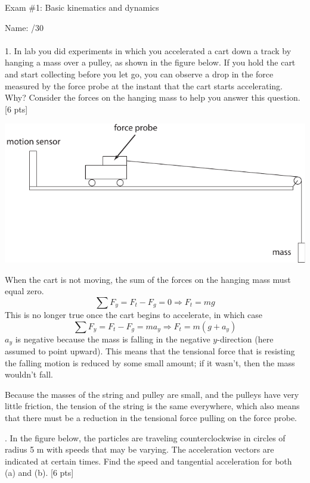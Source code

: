 \documentclass[11pt,letterpaper]{article}
\newcommand{\sol}[1]{{\color{NavyBlue} #1}}
\begin{document}
\setlength{\parindent}{0cm}
\setlength{\parskip}{11pt}
Exam \#1: Basic kinematics and dynamics

Name: \hfill /30\\

\hrulefill\\
1. In lab you did experiments in which you accelerated a cart down a track by hanging a mass over a pulley, as shown in the figure below. If you hold the cart and start collecting before you let go, you can observe a drop in the force measured by the force probe at the instant that the cart starts accelerating. Why? Consider the forces on the hanging mass to help you answer this question. [6 pts]

\includegraphics[width=\textwidth]{../../labs/lab3-forces/cart_and_pulley.pdf}

\sol{When the cart is not moving, the sum of the forces on the hanging mass must equal zero.
\begin{equation}
\sum F_y = F_t - F_g = 0 \Rightarrow F_t = mg
\end{equation}
This is no longer true once the cart begins to accelerate, in which case
\begin{equation}
\sum F_y = F_t - F_g = ma_y \Rightarrow F_t = m(g+a_y)
\end{equation}
$a_y$ is negative because the mass is falling in the negative $y$-direction (here assumed to point upward). This means that the tensional force that is resisting the falling motion is reduced by some small amount; if it wasn't, then the mass wouldn't fall.

Because the masses of the string and pulley are small, and the pulleys have very little friction, the tension of the string is the same everywhere, which also means that there must be a reduction in the tensional force pulling on the force probe.

}

. In the figure below, the particles are traveling counterclockwise in circles of radius 5 m with speeds that may be varying. The acceleration vectors are indicated at certain times. Find the speed and tangential acceleration for both (a) and (b). [6 pts]
\end{document}
